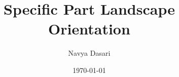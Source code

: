 \documentclass{article}
\title{Specific Part Landscape Orientation}
\author{Navya Dasari}
\date{\today}
\usepackage{lipsum}
\usepackage{pdflscape}


	\maketitle
	
	\section{Title}
	\lipsum[1-2]
	
	\begin{landscape}
		
		\section{Second Title}
		\lipsum[1-2]
	
	\end{landscape}
	

